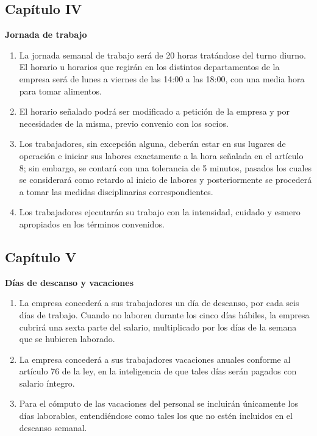 \documentclass[11pt,letterpaper]{report}
\begin{document}
\subsection{Capítulo IV}
\begin{center}
{\bf Jornada de trabajo}
\end{center}
\begin{enumerate}
\item La jornada semanal de trabajo será de 20 horas tratándose del turno diurno. El horario u horarios que regirán en los distintos departamentos de la empresa será de lunes a viernes de las 14:00 a las 18:00, con una media hora para tomar alimentos.
\item El horario señalado podrá ser modificado a petición de la empresa y por necesidades de la misma, previo convenio con los socios.
\item Los trabajadores, sin excepción alguna, deberán estar en sus lugares de operación e iniciar sus labores exactamente a la hora señalada en el artículo 8; sin embargo, se contará con una tolerancia de 5 minutos, pasados los cuales se considerará como retardo al inicio de labores y posteriormente se procederá a tomar las medidas disciplinarias correspondientes.
\item Los trabajadores ejecutarán su trabajo con la intensidad, cuidado y esmero apropiados en los términos convenidos.
\end{enumerate}
\subsection{Capítulo V}
\begin{center}
{\bf Días de descanso y vacaciones}
\end{center}
\begin{enumerate}
\item La empresa concederá a sus trabajadores un día de descanso, por cada seis días de trabajo. Cuando no laboren durante los cinco días hábiles, la empresa cubrirá una sexta parte del salario, multiplicado por los días de la semana que se hubieren laborado.
\item La empresa concederá a sus trabajadores vacaciones anuales conforme al artículo 76 de la ley, en la inteligencia de que tales días serán pagados con salario íntegro.
\item Para el cómputo de las vacaciones del personal se incluirán únicamente los días laborables, entendiéndose como tales los que no estén incluidos en el descanso semanal.
\end{enumerate}
\end{document}
